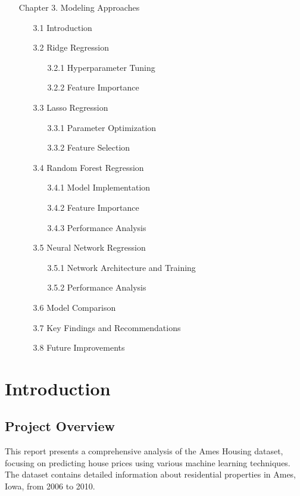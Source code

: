 \documentclass[12pt]{report}
\begin{document}
\begin{itemize}
\item[Chapter 3.] Modeling Approaches
    \begin{itemize}
    \item[3.1] Introduction
    \item[3.2] Ridge Regression
        \begin{itemize}
        \item[3.2.1] Hyperparameter Tuning
        \item[3.2.2] Feature Importance
        \end{itemize}
    \item[3.3] Lasso Regression
        \begin{itemize}
        \item[3.3.1] Parameter Optimization
        \item[3.3.2] Feature Selection
        \end{itemize}
    \item[3.4] Random Forest Regression
        \begin{itemize}
        \item[3.4.1] Model Implementation
        \item[3.4.2] Feature Importance
        \item[3.4.3] Performance Analysis
        \end{itemize}
    \item[3.5] Neural Network Regression
        \begin{itemize}
        \item[3.5.1] Network Architecture and Training
        \item[3.5.2] Performance Analysis
        \end{itemize}
    \item[3.6] Model Comparison
    \item[3.7] Key Findings and Recommendations
    \item[3.8] Future Improvements
    \end{itemize}
\end{itemize}

\chapter{Introduction}

\section{Project Overview}
This report presents a comprehensive analysis of the Ames Housing dataset, focusing on predicting house prices using various machine learning techniques. The dataset contains detailed information about residential properties in Ames, Iowa, from 2006 to 2010.
\end{document}
